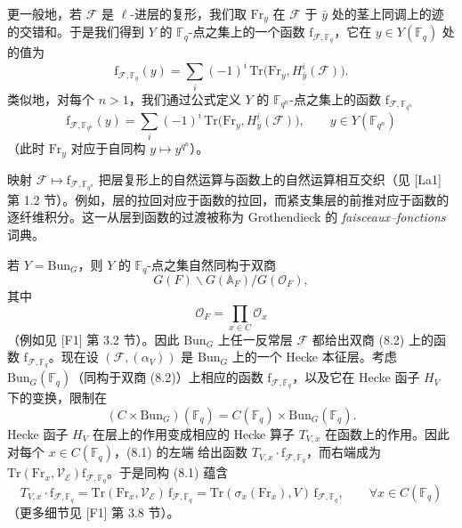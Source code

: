 \documentclass[11pt,a4paper]{article}
\newcommand{\Bun}{\mathrm{Bun}}
\begin{document}
更一般地，若 $\mathcal{F}$ 是 $\ell$-进层的复形，我们取 $\mathrm{Fr}_y$ 在 $\mathcal{F}$ 于 $\bar y$ 处的茎上同调上的迹的交错和。于是我们得到 $Y$ 的 $\mathbb{F}_q$-点之集上的一个函数 $\mathrm{f}_{\mathcal{F},\mathbb{F}_q}$，它在 $y\in Y(\mathbb{F}_q)$ 处的值为
\[
\mathrm{f}_{\mathcal{F},\mathbb{F}_q}(y) = \sum_i (-1)^i\,\mathrm{Tr}\bigl(\mathrm{Fr}_y, H^i_{\bar y}(\mathcal{F})\bigr).
\]
类似地，对每个 $n > 1$，我们通过公式定义 $Y$ 的 $\mathbb{F}_{q^n}$-点之集上的函数 $\mathrm{f}_{\mathcal{F},\mathbb{F}_{q^n}}$
\[
\mathrm{f}_{\mathcal{F},\mathbb{F}_{q^n}}(y) = \sum_i (-1)^i\,\mathrm{Tr}\bigl(\mathrm{Fr}_y, H^i_{\bar y}(\mathcal{F})\bigr), \qquad y\in Y(\mathbb{F}_{q^n})
\]
（此时 $\mathrm{Fr}_y$ 对应于自同构 $y \mapsto y^{q^n}$）。

映射 $\mathcal{F} \mapsto \mathrm{f}_{\mathcal{F},\mathbb{F}_{q^n}}$ 把层复形上的自然运算与函数上的自然运算相互交织（见 [La1] 第 1.2 节）。例如，层的拉回对应于函数的拉回，而紧支集层的前推对应于函数的逐纤维积分。这一从层到函数的过渡被称为 Grothendieck 的 \textit{faisceaux--fonctions} 词典。

若 $Y = \Bun_G$，则 $Y$ 的 $\mathbb{F}_q$-点之集自然同构于双商
\begin{equation}\tag{8.2}
G(F)\backslash G(\mathbb{A}_F)/G(\mathcal{O}_F),
\end{equation}
其中
\[
\mathcal{O}_F = \prod_{x\in C}\mathcal{O}_x
\]
（例如见 [F1] 第 3.2 节）。因此 $\Bun_G$ 上任一反常层 $\mathcal{F}$ 都给出双商 (8.2) 上的函数 $\mathrm{f}_{\mathcal{F},\mathbb{F}_q}$。现在设 $(\mathcal{F}, (\alpha_V))$ 是 $\Bun_G$ 上的一个 Hecke 本征层。考虑 $\Bun_G(\mathbb{F}_q)$（同构于双商 (8.2)）上相应的函数 $\mathrm{f}_{\mathcal{F},\mathbb{F}_q}$，以及它在 Hecke 函子 $H_V$ 下的变换，限制在
\[
(C \times \Bun_G)(\mathbb{F}_q) = C(\mathbb{F}_q)\times \Bun_G(\mathbb{F}_q).
\]
Hecke 函子 $H_V$ 在层上的作用变成相应的 Hecke 算子 $T_{V,x}$ 在函数上的作用。因此对每个 $x\in C(\mathbb{F}_q)$，(8.1) 的左端
给出函数 $T_{V,x}\cdot \mathrm{f}_{\mathcal{F},\mathbb{F}_q}$，而右端成为 $\mathrm{Tr}(\mathrm{Fr}_x, \mathcal{V}_{\mathcal{E}})\mathrm{f}_{\mathcal{F},\mathbb{F}_q}$。于是同构 (8.1) 蕴含
\begin{equation}\tag{8.3}
T_{V,x}\cdot \mathrm{f}_{\mathcal{F},\mathbb{F}_q} = \mathrm{Tr}(\mathrm{Fr}_x, \mathcal{V}_{\mathcal{E}})\,\mathrm{f}_{\mathcal{F},\mathbb{F}_q} = \mathrm{Tr}(\sigma_x(\mathrm{Fr}_x), V)\,\mathrm{f}_{\mathcal{F},\mathbb{F}_q}, \qquad \forall x\in C(\mathbb{F}_q)
\end{equation}
（更多细节见 [F1] 第 3.8 节）。
\end{document}

